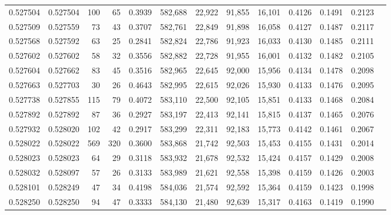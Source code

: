 \begin{tabular}{rrrrrrrrrrrrr}
0.527504 & 0.527504 &   100 &    65 &                                     0.3939 & 582,688 &  22,922 &  91,855 &  16,101 & 0.4126 & 0.1491 & 0.2123 \\
0.527509 & 0.527559 &    73 &    43 &                                     0.3707 & 582,761 &  22,849 &  91,898 &  16,058 & 0.4127 & 0.1487 & 0.2117 \\
0.527568 & 0.527592 &    63 &    25 &                                     0.2841 & 582,824 &  22,786 &  91,923 &  16,033 & 0.4130 & 0.1485 & 0.2111 \\
0.527602 & 0.527602 &    58 &    32 &                                     0.3556 & 582,882 &  22,728 &  91,955 &  16,001 & 0.4132 & 0.1482 & 0.2105 \\
0.527604 & 0.527662 &    83 &    45 &                                     0.3516 & 582,965 &  22,645 &  92,000 &  15,956 & 0.4134 & 0.1478 & 0.2098 \\
0.527663 & 0.527703 &    30 &    26 &                                     0.4643 & 582,995 &  22,615 &  92,026 &  15,930 & 0.4133 & 0.1476 & 0.2095 \\
0.527738 & 0.527855 &   115 &    79 &                                     0.4072 & 583,110 &  22,500 &  92,105 &  15,851 & 0.4133 & 0.1468 & 0.2084 \\
0.527892 & 0.527892 &    87 &    36 &                                     0.2927 & 583,197 &  22,413 &  92,141 &  15,815 & 0.4137 & 0.1465 & 0.2076 \\
0.527932 & 0.528020 &   102 &    42 &                                     0.2917 & 583,299 &  22,311 &  92,183 &  15,773 & 0.4142 & 0.1461 & 0.2067 \\
0.528022 & 0.528022 &   569 &   320 &                                     0.3600 & 583,868 &  21,742 &  92,503 &  15,453 & 0.4155 & 0.1431 & 0.2014 \\
0.528023 & 0.528023 &    64 &    29 &                                     0.3118 & 583,932 &  21,678 &  92,532 &  15,424 & 0.4157 & 0.1429 & 0.2008 \\
0.528032 & 0.528097 &    57 &    26 &                                     0.3133 & 583,989 &  21,621 &  92,558 &  15,398 & 0.4159 & 0.1426 & 0.2003 \\
0.528101 & 0.528249 &    47 &    34 &                                     0.4198 & 584,036 &  21,574 &  92,592 &  15,364 & 0.4159 & 0.1423 & 0.1998 \\
0.528250 & 0.528250 &    94 &    47 &                                     0.3333 & 584,130 &  21,480 &  92,639 &  15,317 & 0.4163 & 0.1419 & 0.1990 \\

\end{tabular}
